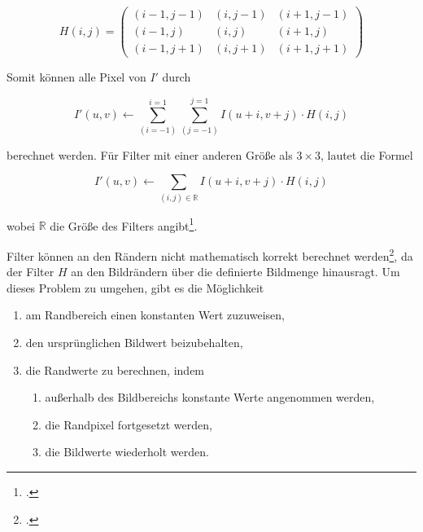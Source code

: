 \begin{equation}
	H(i,j) =
	\begin{pmatrix}
		\left(i-1, j-1\right)&	\left(i, j-1\right)&	\left(i+1, j-1\right)\\
		\left(i-1, j\right)& 	\left(i, j\right)&		\left(i+1, j\right)\\
		\left(i-1, j+1\right)&	\left(i, j+1\right)&	\left(i+1, j+1\right)
	\end{pmatrix}
\end{equation}

Somit können alle Pixel von $I'$ durch

\begin{equation}
	I'\left(u,v\right) \gets
	\sum \limits_{\left(i = -1\right)}^{i = 1}
	\sum \limits_{\left(j = -1\right)}^{j = 1}
	I\left(u + i, v + j\right) \cdot H\left(i,j\right)
\end{equation}

berechnet werden. Für Filter mit einer anderen Größe als $3 \times 3$, lautet die Formel

\begin{equation}
	I'\left(u,v\right) \gets
	\sum_{\left(i,j\right)\in\mathbb{R}} I\left(u + i, v + j\right) \cdot H\left(i,j\right)
\end{equation}

wobei $\mathbb{R}$ die Größe des Filters angibt\footcite[Vgl.][S.~92--93]{burger05}.

Filter können an den Rändern nicht mathematisch korrekt berechnet werden\footcite[Vgl.][S.~113]{burger05}, da der Filter $H$ an den Bildrändern über die definierte Bildmenge hinausragt. Um dieses Problem zu umgehen, gibt es die Möglichkeit

\begin{enumerate}
	\item am Randbereich einen konstanten Wert zuzuweisen,\label{konstant}
	\item den ursprünglichen Bildwert beizubehalten,\label{nix}
	\item die Randwerte zu berechnen, indem
	\begin{enumerate}
		\item außerhalb des Bildbereichs konstante Werte angenommen werden,\label{berechneKonstant}
		\item die Randpixel fortgesetzt werden,\label{berechneRand}
		\item die Bildwerte wiederholt werden.\label{berechneBild}
	\end{enumerate}
\end{enumerate}

